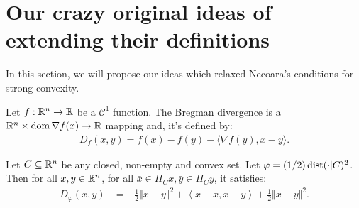 \documentclass[12pt]{article}
\begin{document}
\section{Our crazy original ideas of extending their definitions}
    In this section, we will propose our ideas which relaxed Necoara's conditions for strong convexity.
    \begin{definition}\label{def:bd}
        Let $f: \mathbb R^n \rightarrow \mathbb R$ be a $\mathcal C^1$ function. 
        The Bregman divergence is a $\mathbb R^n \times \operatorname{dom} \nabla f(x)\rightarrow \mathbb R$ mapping and, it's defined by:  
        \begin{align*}
            D_f(x, y) = f(x) - f(y) - \langle \nabla f(y), x - y\rangle. 
        \end{align*}
    \end{definition}
    \begin{theorem}\label{thm:bd-dist-sq}
        Let $C \subseteq \mathbb R^n$ be any closed, non-empty and convex set. 
        Let $\varphi = (1/2)\operatorname{dist}(\cdot | C)^2$.
        Then for all $x, y \in \mathbb R^n$, for all $\bar x \in \Pi_C x, \bar y \in \Pi_C y$, it satisfies: 
        \begin{align*}
            D_{\varphi}(x, y) 
            &= 
            - \frac{1}{2}\Vert \bar  x - \bar  y\Vert^2
            + \left\langle x - \bar  x, \bar x - \bar y\right\rangle
            + \frac{1}{2} \Vert x - y\Vert^2. 
        \end{align*}
    \end{theorem}
\end{document}

